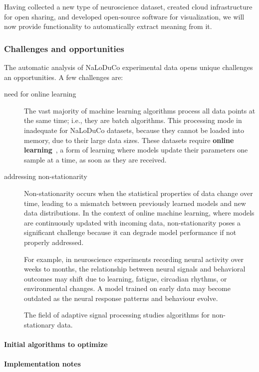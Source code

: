 
Having collected a new type of neuroscience dataset, created cloud
infrastructure for open sharing, and developed open-source software for
visualization, we will now provide functionality to automatically extract
meaning from it.

\subsubsection*{Challenges and opportunities}

The automatic analysis of NaLoDuCo experimental data opens unique challenges an
opportunities. A few challenges are:

\begin{description}

    \item[need for online learning] The vast majority of machine learning
    algorithms process all data points at the same time; i.e., they are batch
    algorithms. This processing mode in inadequate for NaLoDuCo datasets,
    because they cannot be loaded into memory, due to their large data sizes.
    These datasets require \textbf{online learning}~\citep{shalevShwartz12}, a
    form of learning where models update their parameters one sample at a time,
    as soon as they are received.

    \item[addressing non-stationarity] Non-stationarity occurs when the statistical
    properties of data change over time, leading to a mismatch between
    previously learned models and new data distributions. In the context of
    online machine learning, where models are continuously updated with
    incoming data, non-stationarity poses a significant challenge because it
    can degrade model performance if not properly addressed.

    For example, in neuroscience experiments recording neural activity over
    weeks to months, the relationship between neural signals and behavioral
    outcomes may shift due to learning, fatigue, circadian rhythms, or
    environmental changes. A model trained on early data may become outdated as
    the neural response patterns and behaviour evolve.

    The field of adaptive signal processing\citep{haykin02} studies algorithms for
    non-stationary data.

\end{description}

\paragraph{Initial algorithms to optimize}

\paragraph{Implementation notes}
